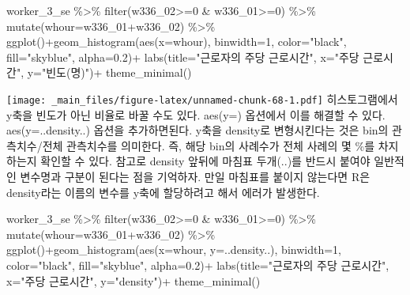 \documentclass[
]{book}
\newenvironment{Shaded}{\begin{snugshade}}{\end{snugshade}}
\newcommand{\AttributeTok}[1]{\textcolor[rgb]{0.77,0.63,0.00}{#1}}
\newcommand{\DecValTok}[1]{\textcolor[rgb]{0.00,0.00,0.81}{#1}}
\newcommand{\FloatTok}[1]{\textcolor[rgb]{0.00,0.00,0.81}{#1}}
\newcommand{\FunctionTok}[1]{\textcolor[rgb]{0.00,0.00,0.00}{#1}}
\newcommand{\NormalTok}[1]{#1}
\newcommand{\SpecialCharTok}[1]{\textcolor[rgb]{0.00,0.00,0.00}{#1}}
\newcommand{\StringTok}[1]{\textcolor[rgb]{0.31,0.60,0.02}{#1}}
\theoremstyle{definition}
\theoremstyle{definition}
\theoremstyle{definition}
\theoremstyle{definition}
\theoremstyle{remark}
\begin{document}
\begin{Shaded}
\begin{Highlighting}[]
\NormalTok{worker\_3\_se }\SpecialCharTok{\%\textgreater{}\%} 
  \FunctionTok{filter}\NormalTok{(w336\_02}\SpecialCharTok{\textgreater{}=}\DecValTok{0} \SpecialCharTok{\&}\NormalTok{ w336\_01}\SpecialCharTok{\textgreater{}=}\DecValTok{0}\NormalTok{) }\SpecialCharTok{\%\textgreater{}\%} 
  \FunctionTok{mutate}\NormalTok{(}\AttributeTok{whour=}\NormalTok{w336\_01}\SpecialCharTok{+}\NormalTok{w336\_02) }\SpecialCharTok{\%\textgreater{}\%} 
  \FunctionTok{ggplot}\NormalTok{()}\SpecialCharTok{+}\FunctionTok{geom\_histogram}\NormalTok{(}\FunctionTok{aes}\NormalTok{(}\AttributeTok{x=}\NormalTok{whour), }\AttributeTok{binwidth=}\DecValTok{1}\NormalTok{, }\AttributeTok{color=}\StringTok{"black"}\NormalTok{, }\AttributeTok{fill=}\StringTok{"skyblue"}\NormalTok{, }\AttributeTok{alpha=}\FloatTok{0.2}\NormalTok{)}\SpecialCharTok{+}
  \FunctionTok{labs}\NormalTok{(}\AttributeTok{title=}\StringTok{"근로자의 주당 근로시간"}\NormalTok{, }\AttributeTok{x=}\StringTok{"주당 근로시간"}\NormalTok{, }\AttributeTok{y=}\StringTok{"빈도(명)"}\NormalTok{)}\SpecialCharTok{+}
  \FunctionTok{theme\_minimal}\NormalTok{()}
\end{Highlighting}
\end{Shaded}

\texttt{[image: \_main\_files/figure-latex/unnamed-chunk-68-1.pdf]}
히스토그램에서 y축을 빈도가 아닌 비율로 바꿀 수도 있다. aes(y=) 옵션에서 이를 해결할 수 있다. aes(y=..density..) 옵션을 추가하면된다. y축을 density로 변형시킨다는 것은 bin의 관측치수/전체 관측치수를 의미한다. 즉, 해당 bin의 사례수가 전체 사례의 몇 \%를 차지하는지 확인할 수 있다. 참고로 density 앞뒤에 마침표 두개(..)를 반드시 붙여야 일반적인 변수명과 구분이 된다는 점을 기억하자. 만일 마침표를 붙이지 않는다면 R은 density라는 이름의 변수를 y축에 할당하려고 해서 에러가 발생한다.

\begin{Shaded}
\begin{Highlighting}[]
\NormalTok{worker\_3\_se }\SpecialCharTok{\%\textgreater{}\%} 
  \FunctionTok{filter}\NormalTok{(w336\_02}\SpecialCharTok{\textgreater{}=}\DecValTok{0} \SpecialCharTok{\&}\NormalTok{ w336\_01}\SpecialCharTok{\textgreater{}=}\DecValTok{0}\NormalTok{) }\SpecialCharTok{\%\textgreater{}\%} 
  \FunctionTok{mutate}\NormalTok{(}\AttributeTok{whour=}\NormalTok{w336\_01}\SpecialCharTok{+}\NormalTok{w336\_02) }\SpecialCharTok{\%\textgreater{}\%} 
  \FunctionTok{ggplot}\NormalTok{()}\SpecialCharTok{+}\FunctionTok{geom\_histogram}\NormalTok{(}\FunctionTok{aes}\NormalTok{(}\AttributeTok{x=}\NormalTok{whour, }\AttributeTok{y=}\NormalTok{..density..), }\AttributeTok{binwidth=}\DecValTok{1}\NormalTok{, }\AttributeTok{color=}\StringTok{"black"}\NormalTok{, }\AttributeTok{fill=}\StringTok{"skyblue"}\NormalTok{, }\AttributeTok{alpha=}\FloatTok{0.2}\NormalTok{)}\SpecialCharTok{+}
  \FunctionTok{labs}\NormalTok{(}\AttributeTok{title=}\StringTok{"근로자의 주당 근로시간"}\NormalTok{, }\AttributeTok{x=}\StringTok{"주당 근로시간"}\NormalTok{, }\AttributeTok{y=}\StringTok{"density"}\NormalTok{)}\SpecialCharTok{+}
  \FunctionTok{theme\_minimal}\NormalTok{()}
\end{Highlighting}
\end{Shaded}
\end{document}
